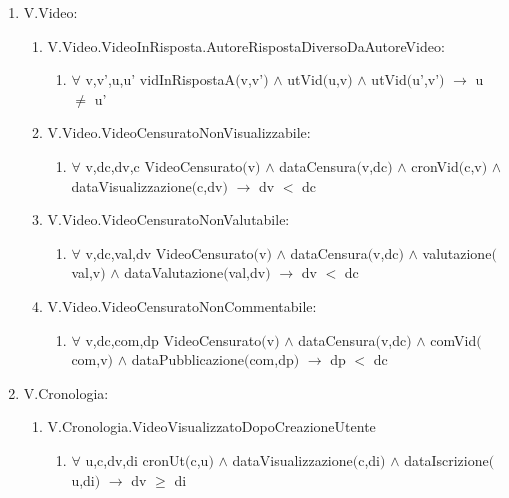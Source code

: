 \documentclass{article}
\begin{document}
\begin{enumerate}
    \item V.Video:
    \begin{enumerate}
        \item V.Video.VideoInRisposta.AutoreRispostaDiversoDaAutoreVideo: 
        \begin{enumerate}
            \item $\forall$ v,v',u,u' vidInRispostaA$($v,v'$)$ $\land$ utVid$($u,v$)$ $\land$ utVid$($u',v'$)$ $\rightarrow$ u $\neq$ u'
        \end{enumerate}
        \item V.Video.VideoCensuratoNonVisualizzabile:
        \begin{enumerate}
            \item $\forall$ v,dc,dv,c VideoCensurato$($v$)$ $\land$ dataCensura$($v,dc$)$ $\land$ cronVid$($c,v$)$ $\land$ dataVisualizzazione$($c,dv$)$ $\rightarrow$ dv $<$ dc
        \end{enumerate}
        \item V.Video.VideoCensuratoNonValutabile:
        \begin{enumerate}
            \item $\forall$ v,dc,val,dv VideoCensurato$($v$)$ $\land$ dataCensura$($v,dc$)$ $\land$ valutazione$($val,v$)$ $\land$ dataValutazione$($val,dv$)$ $\rightarrow$ dv $<$ dc
        \end{enumerate}
        \item V.Video.VideoCensuratoNonCommentabile:
        \begin{enumerate}
            \item $\forall$ v,dc,com,dp VideoCensurato$($v$)$ $\land$ dataCensura$($v,dc$)$ $\land$ comVid$($com,v$)$ $\land$ dataPubblicazione$($com,dp$)$ $\rightarrow$ dp $<$ dc
        \end{enumerate}
    \end{enumerate}
    \item V.Cronologia:
    \begin{enumerate}
        \item V.Cronologia.VideoVisualizzatoDopoCreazioneUtente
        \begin{enumerate}
            \item $\forall$ u,c,dv,di cronUt$($c,u$)$ $\land$ dataVisualizzazione$($c,di$)$ $\land$ dataIscrizione$($u,di$)$ $\rightarrow$ dv $\geq$ di
        \end{enumerate}
    \end{enumerate}

\end{enumerate}
\end{document}
